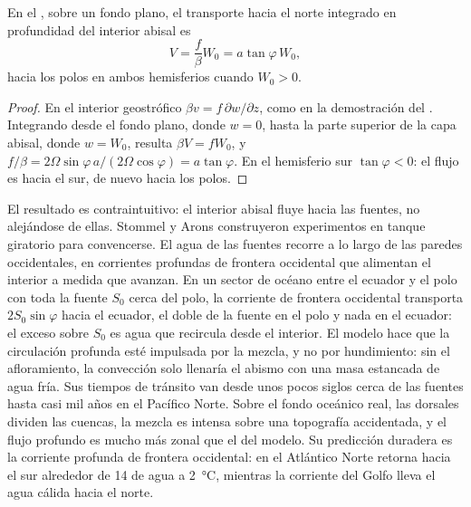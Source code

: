 \begin{proposition}\label{prop:b3:ocean-dynamics:abyssal}
En el , sobre un fondo plano, el transporte hacia el norte integrado
en profundidad del interior abisal es
\[
V = \frac{f}{\beta}W_0 = a\tan\varphi\,W_0 ,
\]
hacia los polos en ambos hemisferios cuando $W_0 > 0$.
\end{proposition}

\begin{proof}
En el interior geostrófico $\beta v = f\,\partial w/\partial z$, como en la
demostración del . Integrando desde el fondo plano, donde
$w = 0$, hasta la parte superior de la capa abisal, donde $w = W_0$, resulta $\beta V =
fW_0$, y $f/\beta = 2\Omega\sin\varphi\,a/(2\Omega\cos\varphi) =
a\tan\varphi$. En el hemisferio sur $\tan\varphi < 0$: el flujo es
hacia el sur, de nuevo hacia los polos.
\end{proof}

El resultado es contraintuitivo: el interior abisal fluye hacia las
fuentes, no alejándose de ellas. Stommel y Arons construyeron experimentos en tanque giratorio
para convencerse. El agua de las fuentes recorre
a lo largo de las paredes occidentales, en corrientes profundas de frontera occidental que alimentan el
interior a medida que avanzan. En un sector de océano entre el ecuador y el polo
con toda la fuente $S_0$ cerca del polo, la corriente de frontera occidental
transporta $2S_0\sin\varphi$ hacia el ecuador, el doble de la fuente en el polo
y nada en el ecuador: el exceso sobre $S_0$ es agua que recircula
desde el interior. El modelo hace que la circulación profunda esté impulsada por la mezcla,
y no por hundimiento: sin el afloramiento, la convección solo llenaría el
abismo con una masa estancada de agua fría. Sus tiempos de tránsito van desde unos
pocos siglos cerca de las fuentes hasta casi mil años en el Pacífico
Norte. Sobre el fondo oceánico real, las dorsales dividen las cuencas, la mezcla es
intensa sobre una topografía accidentada, y el flujo profundo es mucho más zonal que el
del modelo. Su predicción duradera es la corriente profunda de frontera occidental: en
el Atlántico Norte retorna hacia el sur alrededor de \qty{14}{\sverdrup} de agua a
\qty{2}{\celsius}, mientras la corriente del Golfo lleva
el agua cálida hacia el norte.

